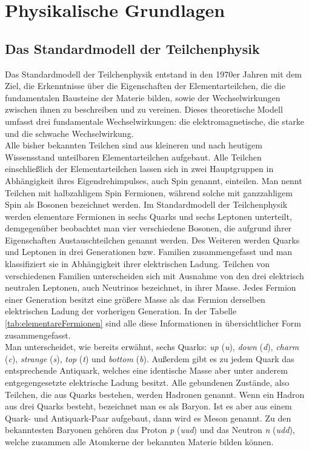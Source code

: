 \documentclass[12pt,a4paper]{report}
\begin{document}
\chapter{Physikalische Grundlagen}
\label{cha:PGrundlagen}
\section{Das Standardmodell der Teilchenphysik}
\label{sec:DasSMT}
Das Standardmodell der Teilchenphysik entstand in den 1970er Jahren mit dem Ziel, die Erkenntnisse über die Eigenschaften der Elementarteilchen, die die fundamentalen Bausteine der Materie bilden, sowie der \sloppy Wechselwirkungen zwischen ihnen zu beschreiben und zu vereinen. Dieses theoretische Modell umfasst drei fundamentale Wechselwirkungen: die elektromagnetische, die starke und die schwache Wechselwirkung. \\
Alle bisher bekannten Teilchen sind aus kleineren und nach heutigem Wissensstand unteilbaren Elementarteilchen aufgebaut. Alle Teilchen einschließlich der Elementarteilchen lassen sich in zwei Hauptgruppen in Abhängigkeit ihres Eigendrehimpulses, auch Spin genannt, einteilen. Man nennt Teilchen mit halbzahligem Spin Fermionen, während solche mit ganzzahligem Spin als Bosonen bezeichnet werden. Im Standardmodell der Teilchenphysik werden elementare Fermionen in sechs Quarks und sechs Leptonen unterteilt, demgegenüber beobachtet man vier verschiedene Bosonen, die aufgrund ihrer Eigenschaften Austauschteilchen genannt werden. Des Weiteren werden Quarks und Leptonen in drei Generationen bzw. Familien zusammengefasst und man klassifiziert sie in Abhängigkeit ihrer elektrischen Ladung. Teilchen von verschiedenen Familien unterscheiden sich mit Ausnahme von den drei elektrisch neutralen Leptonen, auch Neutrinos bezeichnet, in ihrer Masse. Jedes Fermion einer Generation besitzt eine größere Masse als das Fermion derselben elektrischen Ladung der vorherigen Generation. In der Tabelle \ref{tab:elementareFermionen} sind alle diese Informationen in übersichtlicher Form zusammengefasst. \\
Man unterscheidet, wie bereits erwähnt, sechs Quarks: \textit{up} (\textit{u}), \textit{down} (\textit{d}), \textit{charm} (\textit{c}), \sloppy \textit{strange} (\textit{s}), \textit{top} (\textit{t}) und \textit{bottom} (\textit{b}). Außerdem gibt es zu jedem Quark das entsprechende Antiquark, welches eine identische Masse aber unter anderem entgegengesetzte elektrische Ladung besitzt. Alle gebundenen Zustände, also Teilchen, die aus Quarks bestehen, werden Hadronen genannt. Wenn ein Hadron aus drei Quarks besteht, bezeichnet man es als Baryon. Ist es aber aus einem Quark- und Antiquark-Paar aufgebaut, dann wird es Meson genannt. Zu den bekanntesten Ba\-ryonen gehören das Proton \textit{p} (\textit{uud}) und das Neutron \textit{n} (\textit{udd}), welche zusammen alle Atomkerne der bekannten Materie bilden können. \\
\end{document}
